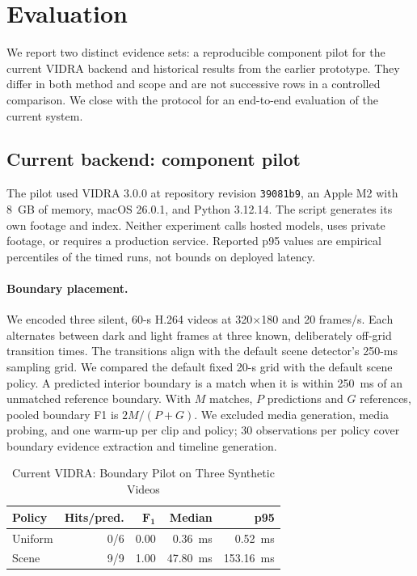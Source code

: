 \section{Evaluation}
\label{sec:evaluation}
We report two distinct evidence sets: a reproducible component pilot for the current VIDRA backend and historical results from the earlier prototype. They differ in both method and scope and are not successive rows in a controlled comparison. We close with the protocol for an end-to-end evaluation of the current system.

\subsection{Current backend: component pilot}
\label{sec:pilot}
The pilot used VIDRA 3.0.0 at repository revision \texttt{39081b9}, an Apple M2 with 8~GB of memory, macOS 26.0.1, and Python 3.12.14. The script generates its own footage and index. Neither experiment calls hosted models, uses private footage, or requires a production service. Reported p95 values are empirical percentiles of the timed runs, not bounds on deployed latency.

\paragraph{Boundary placement.}
We encoded three silent, 60-s H.264 videos at 320$\times$180 and 20 frames/s. Each alternates between dark and light frames at three known, deliberately off-grid transition times. The transitions align with the default scene detector's 250-ms sampling grid. We compared the default fixed 20-s grid with the default scene policy. A predicted interior boundary is a match when it is within 250~ms of an unmatched reference boundary. With $M$ matches, $P$ predictions and $G$ references, pooled boundary F1 is $2M/(P+G)$. We excluded media generation, media probing, and one warm-up per clip and policy; 30 observations per policy cover boundary evidence extraction and timeline generation.

\begin{table}[!t]
\caption{Current VIDRA: Boundary Pilot on Three Synthetic Videos}
\label{tab:boundaries}
\centering
\small
\begin{tabular}{@{}lrrrr@{}}
\toprule
\textbf{Policy} & \textbf{Hits/pred.} & $\boldsymbol{F_1}$ & \textbf{Median} & \textbf{p95} \\
\midrule
Uniform & 0/6 & 0.00 & 0.36~ms & 0.52~ms \\
Scene & 9/9 & 1.00 & 47.80~ms & 153.16~ms \\
\bottomrule
\end{tabular}
\end{table}

